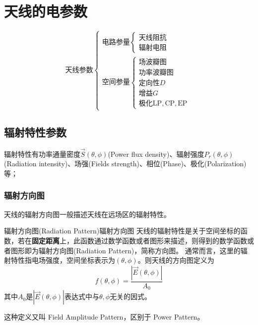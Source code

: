 \chapter{天线的电参数}
\begin{equation*}
\mbox{天线参数}
\begin{cases}
    \mbox{电路参量}
    \begin{cases}
        \mbox{天线阻抗}\\
        \mbox{辐射电阻}
    \end{cases}\\
    \mbox{空间参量}
    \begin{cases}
        \mbox{场波瓣图}\\
        \mbox{功率波瓣图}\\
        \mbox{定向性}D\\
        \mbox{增益}G\\
        \mbox{极化}\mathrm{LP},\mathrm{CP},\mathrm{EP}
    \end{cases}
\end{cases}
\end{equation*}

\section{辐射特性参数}
    辐射特性有功率通量密度$\vec{S}(\theta,\phi)$(Power flux density)、辐射强度$P_r(\theta,\phi)$(Radiation intensity)、场强(Fields strength)、相位(Phase)、极化(Polarization)等；

    \subsection{辐射方向图}
    天线的辐射方向图一般描述天线在远场区的辐射特性。
    \begin{definition}{辐射方向图(Radiation Pattern)}{辐射方向图}
    天线的辐射特性是关于空间坐标的函数，若在\textbf{固定距离}上，此函数通过数学函数或者图形来描述，则得到的数学函数或者图形即为辐射方向图(Radiation Pattern)，简称方向图。
    \tcblower
    通常而言，这里的辐射特性指电场强度，空间坐标表示为$(\theta,\phi)$。则天线的方向图定义为
    \begin{equation}
        f(\theta,\phi)=\frac{|\vec{E}(\theta,\phi)|}{A_0}
    \end{equation}
    其中$A_0$是$|\vec{E}(\theta,\phi)|$表达式中与$\theta,\phi$无关的因式。
    
    这种定义又叫 Field Amplitude Pattern，区别于 Power Pattern。
    \end{definition}    
    

